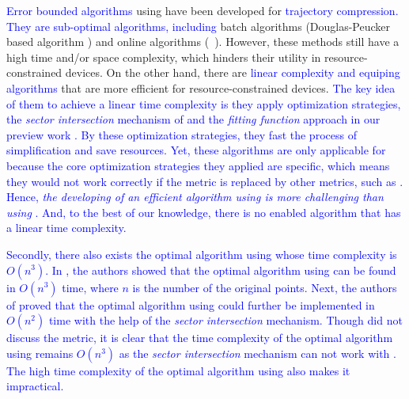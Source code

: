 \textcolor{blue}{Error bounded \lsa algorithms} using \sed have been developed for \textcolor{blue}{trajectory compression. They are sub-optimal algorithms, including} batch algorithms (\eg Douglas-Peucker based algorithm \dpsed \cite{Meratnia:Spatiotemporal}) and online algorithms (\eg\ \squishe \cite{Muckell:Compression}).
However, these methods still have a high time and/or space complexity, which hinders their utility in resource-constrained devices. %
%
On the other hand, there are \textcolor{blue}{linear complexity and \ped equiping \lsa algorithms} \cite{Williams:Longest, Sklansky:Cone, Dunham:Cone, Zhao:Sleeve, Lin:Operb} that are more efficient for resource-constrained devices. 
%
\textcolor{blue}{The key idea of them to achieve a linear time complexity is they apply optimization strategies, \eg the \textit{sector intersection} mechanism of \cite{Williams:Longest, Sklansky:Cone, Dunham:Cone, Zhao:Sleeve} and the \textit{fitting function} approach in our preview work \cite {Lin:Operb}. By these optimization strategies, they fast the process of simplification and save resources. 
Yet, these algorithms are only applicable for \ped because the core optimization strategies they applied are \ped specific, which means they would not work correctly if the \ped metric is replaced by other metrics, such as \sed.} 
\textcolor{blue}{Hence, \textit{the developing of an efficient \lsa algorithm using \sed is more challenging than using \ped}.}
\textcolor{blue}{And, to the best of our knowledge, there is no \sed enabled \lsa algorithm that has a linear time complexity.}

\textcolor{blue}{Secondly, there also exists the optimal \lsa algorithm using \sed whose time complexity is $O(n^3)$.
In \cite{Imai:Optimal}, the authors showed that the optimal \lsa algorithm using \ped can be found in $O(n^3)$ time, where $n$ is the number of the original points. Next, the authors of \cite{Chan:Optimal} proved that the optimal algorithm using \ped could further be implemented in $O(n^2)$ time with the help of the \textit{sector intersection} mechanism. 
Though \cite{Chan:Optimal} did not discuss the \sed metric, it is clear that the time complexity of the optimal \lsa algorithm using \sed remains $O(n^3)$ as the \textit{sector intersection} mechanism can not work with \sed. 
The high time complexity of the optimal \lsa algorithm using \sed also makes it impractical.
}




